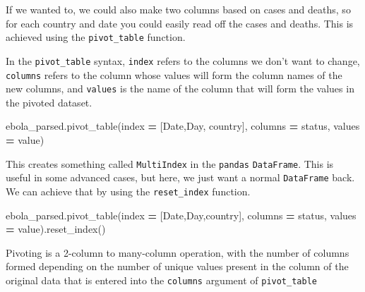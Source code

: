 \documentclass[
  letterpaper,
]{scrbook}
\newenvironment{Shaded}{\begin{snugshade}}{\end{snugshade}}
\newcommand{\NormalTok}[1]{#1}
\newcommand{\OperatorTok}[1]{\textcolor[rgb]{0.81,0.36,0.00}{\textbf{#1}}}
\newcommand{\StringTok}[1]{\textcolor[rgb]{0.31,0.60,0.02}{#1}}
\begin{document}
If we wanted to, we could also make two columns based on cases and deaths, so for each country and date you could easily read off the cases and deaths. This is achieved using the \texttt{pivot\_table} function.

In the \texttt{pivot\_table} syntax, \texttt{index} refers to the columns we don't want to change, \texttt{columns} refers to the column whose values will form the column names of the new columns, and \texttt{values} is the name of the column that will form the values in the pivoted dataset.

\begin{Shaded}
\begin{Highlighting}[]
\NormalTok{ebola\_parsed.pivot\_table(index }\OperatorTok{=}\NormalTok{ [}\StringTok{\textquotesingle{}Date\textquotesingle{}}\NormalTok{,}\StringTok{\textquotesingle{}Day\textquotesingle{}}\NormalTok{, }\StringTok{\textquotesingle{}country\textquotesingle{}}\NormalTok{], columns }\OperatorTok{=} \StringTok{\textquotesingle{}status\textquotesingle{}}\NormalTok{, values }\OperatorTok{=} \StringTok{\textquotesingle{}value\textquotesingle{}}\NormalTok{)}
\end{Highlighting}
\end{Shaded}

This creates something called \texttt{MultiIndex} in the \texttt{pandas} \texttt{DataFrame}. This is useful in some advanced cases, but here, we just want a normal \texttt{DataFrame} back. We can achieve that by using the \texttt{reset\_index} function.

\begin{Shaded}
\begin{Highlighting}[]
\NormalTok{ebola\_parsed.pivot\_table(index }\OperatorTok{=}\NormalTok{ [}\StringTok{\textquotesingle{}Date\textquotesingle{}}\NormalTok{,}\StringTok{\textquotesingle{}Day\textquotesingle{}}\NormalTok{,}\StringTok{\textquotesingle{}country\textquotesingle{}}\NormalTok{], columns }\OperatorTok{=} \StringTok{\textquotesingle{}status\textquotesingle{}}\NormalTok{, values }\OperatorTok{=} \StringTok{\textquotesingle{}value\textquotesingle{}}\NormalTok{).reset\_index()}
\end{Highlighting}
\end{Shaded}

Pivoting is a 2-column to many-column operation, with the number of columns formed depending on the number of unique values present in the column of the original data that is entered into the \texttt{columns} argument of \texttt{pivot\_table}
\end{document}
